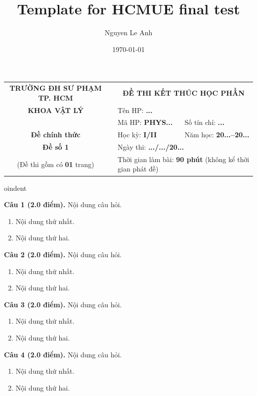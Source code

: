 \documentclass[12pt,a4paper]{exam}
\title{Template for HCMUE final test}
\author{Nguyen Le Anh}
\date{\today}
\begin{document}
\pagestyle{empty}

\begin{longtable}{p{4cm}p{0.5cm}p{4cm}p{4cm}}
\multicolumn{1}{c}{\bf TRƯỜNG ĐH SƯ PHẠM TP. HCM} & &  \multicolumn{2}{c}{\bf ĐỀ THI KẾT THÚC HỌC PHẦN}\\

\multicolumn{1}{c}{\bf KHOA VẬT LÝ} & & \multicolumn{2}{l}{Tên HP: {\bf ...}} \\

& &  \multicolumn{1}{l}{Mã HP: {\bf PHYS...}} &  \multicolumn{1}{l}{Số tín chỉ: {\bf ...}}\\

\multicolumn{1}{c}{\bf Đề chính thức} & & \multicolumn{1}{l}{Học kỳ: {\bf I/II}} & \multicolumn{1}{l}{Năm học: {\bf 20...--20...}}\\

\multicolumn{1}{c}{\bf Đề số 1} & & \multicolumn{2}{l}{Ngày thi: \textbf{.../.../20...}} \\

\multicolumn{1}{c}{(Đề thi gồm có {\bf 01} trang)} & & \multicolumn{2}{l}{Thời gian làm bài: {\bf 90 phút} (không kể thời gian phát đề)}\\
\end{longtable}

\vspace*{1.0cm}
%
oindent

{\bf Câu 1 (2.0 điểm).} Nội dung câu hỏi.
\begin{enumerate}[label=\alph*.]
\item Nội dung thứ nhất.
\item Nội dung thứ hai.
\end{enumerate}

{\bf Câu 2 (2.0 điểm).} Nội dung câu hỏi.
\begin{enumerate}[label=\alph*.]
\item Nội dung thứ nhất.
\item Nội dung thứ hai.
\end{enumerate}

{\bf Câu 3 (2.0 điểm).} Nội dung câu hỏi.
\begin{enumerate}[label=\alph*.]
\item Nội dung thứ nhất.
\item Nội dung thứ hai.
\end{enumerate}

{\bf Câu 4 (2.0 điểm).} Nội dung câu hỏi.
\begin{enumerate}[label=\alph*.]
\item Nội dung thứ nhất.
\item Nội dung thứ hai.
\end{enumerate}
\end{document}
